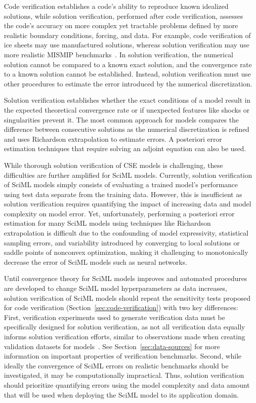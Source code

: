 Code verification establishes a code's ability to reproduce known idealized solutions, while solution verification, performed after code verification, assesses the code's accuracy on more complex yet tractable problems defined by more realistic boundary conditions, forcing, and data. For example, code verification of ice sheets may use manufactured solutions, whereas solution verification may use more realistic MISMIP benchmarks~\cite{Cornford_et_al_TC_2020}. In solution verification, the numerical solution cannot be compared to a known exact solution, and the convergence rate to a known solution cannot be established. Instead, solution verification must use other procedures to estimate the error introduced by the numerical discretization.

Solution verification establishes whether the exact conditions of a model result in the expected theoretical convergence rate or if unexpected features like shocks or singularities prevent it. The most common approach for \CSE{} models compares the difference between consecutive solutions as the numerical discretization is refined and uses Richardson extrapolation to estimate errors. A posteriori error estimation techniques that require solving an adjoint equation can also be used.

While thorough solution verification of CSE models is challenging, these difficulties are further amplified for SciML models. Currently, solution verification of SciML models simply consists of evaluating a trained model's performance using test data separate from the training data. However, this is insufficient as solution verification requires quantifying the impact of increasing data and model complexity on model error. Yet, unfortunately, performing a posteriori error estimation for many SciML models using techniques like Richardson extrapolation is difficult due to the confounding of model expressivity, statistical sampling errors, and variability introduced by converging to local solutions or saddle points of nonconvex optimization, making it challenging to monotonically decrease the error of SciML models such as neural networks. 

Until convergence theory for SciML models improves and automated procedures are developed to change SciML model hyperparameters as data increases, solution verification of SciML models should repeat the sensitivity tests proposed for code verification (Section~\ref{sec:code-verification}) with two key differences:
First, verification experiments used to generate verification data must be specifically designed for solution verification, as not all verification data equally informs solution verification efforts, similar to observations made when creating validation datasets for \CSE{} models~\cite{Oberkampf_T_PAS_2002}. See Section~\ref{sec:data-sources} for more information on important properties of verification benchmarks.
Second, while ideally the convergence of SciML errors on realistic benchmarks should be investigated, it may be computationally impractical. Thus, solution verification should prioritize quantifying errors using the model complexity and data amount that will be used when deploying the SciML model to its application domain.

